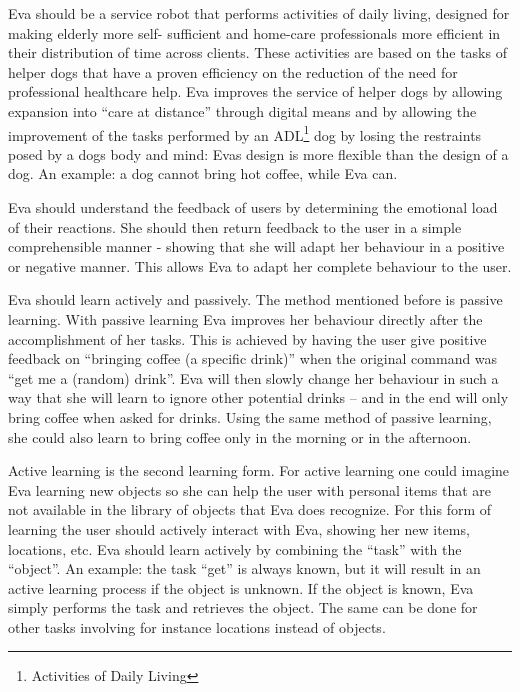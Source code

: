 \documentclass[project_eva.tex]{subfiles}
\begin{document}
Eva should be a service robot that performs activities of daily living, designed for making elderly more self-
sufficient\cite{Forlizzi} and home-care professionals more efficient in their distribution of time across clients. These 
activities are based on the tasks of helper dogs that have a proven efficiency on the reduction of the need for 
professional healthcare help\cite{Diepenhorst}. Eva improves the service of helper dogs by allowing 
expansion into ``care at distance'' \cite{Evers} through digital means and by allowing the improvement of the tasks 
performed by an ADL\footnote{Activities of Daily Living} dog by losing the restraints posed by a dog\textquotesingle s body and mind: Eva\textquotesingle s design is more flexible than the 
design of a dog. An example: a dog cannot bring hot coffee, while Eva can.

Eva should understand the feedback of users by determining the emotional load of their reactions. She should then return 
feedback to the user in a simple comprehensible manner - showing that she will adapt her behaviour in a positive or 
negative manner. This allows Eva to adapt her complete behaviour to the user.

Eva should learn actively and passively. The method mentioned before is passive learning. With passive learning Eva 
improves her behaviour directly after the accomplishment of her tasks. This is achieved by having the user give positive 
feedback on ``bringing coffee (a specific drink)''  when the original command was ``get me a (random) drink''.  Eva will 
then slowly change her behaviour in such a way that she will learn to ignore other potential drinks – and in the end will 
only bring coffee when asked for drinks. Using the same method of passive learning, she could also learn to bring coffee 
only in the morning or in the afternoon.

\label{sec:Concept}
Active learning is the second learning form. For active learning one could imagine Eva learning new objects so 
she can help the user with personal items that are not available in the library of objects that Eva does recognize. 
For this form of learning the user should actively interact with Eva, showing her new items, locations, etc. Eva should 
learn actively by combining the ``task'' with the ``object''. An example: the task ``get'' is always known, but it will 
result in an active learning process if the object is unknown. If the object is known, Eva simply performs the task and 
retrieves the object. The same can be done for other tasks involving for instance locations instead of objects.
\end{document}
